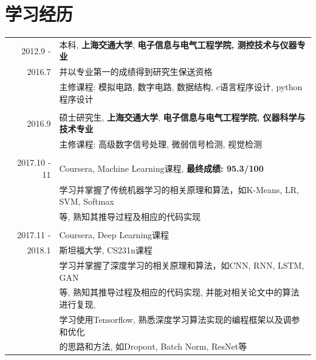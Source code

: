 \documentclass[a4paper,11pt]{article}
\begin{document}
\section{学习经历}
\begin{tabular}{rl}	
  \textsc{2012.9 - } & 本科, \textbf{上海交通大学}, \textbf{电子信息与电气工程学院, 测控技术与仪器专业}\\
  \textsc{2016.7} & 并以专业第一的成绩得到研究生保送资格\\
& 主修课程: 模拟电路, 数字电路, 数据结构, c语言程序设计, python程序设计\\&\\
 \textsc{2016.9  } & 硕士研究生, \textbf{上海交通大学}, \textbf{电子信息与电气工程学院, 仪器科学与技术专业}\\
& 主修课程: 高级数字信号处理, 微弱信号检测, 视觉检测\\&\\
 \textsc{2017.10 - 11} & Coursera, Machine Learning课程, \textbf{最终成绩: 95.3/100}\\
& 学习并掌握了传统机器学习的相关原理和算法，如K-Means, LR, SVM, Softmax\\
& 等, 熟知其推导过程及相应的代码实现\\&\\
 \textsc{2017.11 - } & Coursera, Deep Learning课程\\
 \textsc{2018.1} & 斯坦福大学, CS231n课程\\
& 学习并掌握了深度学习的相关原理和算法，如CNN, RNN, LSTM, GAN\\
& 等, 熟知其推导过程及相应的代码实现, 并能对相关论文中的算法进行复现,\\
& 学习使用Tensorflow, 熟悉深度学习算法实现的编程框架以及调参和优化\\
& 的思路和方法, 如Dropout, Batch Norm, ResNet等\\
\end{tabular}

\end{document}
